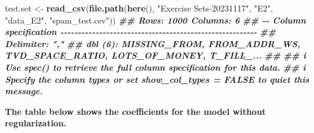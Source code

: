 \documentclass[
]{article}
\newenvironment{Shaded}{\begin{snugshade}}{\end{snugshade}}
\newcommand{\DocumentationTok}[1]{\textcolor[rgb]{0.56,0.35,0.01}{\textbf{\textit{#1}}}}
\newcommand{\FunctionTok}[1]{\textcolor[rgb]{0.13,0.29,0.53}{\textbf{#1}}}
\newcommand{\NormalTok}[1]{#1}
\newcommand{\OtherTok}[1]{\textcolor[rgb]{0.56,0.35,0.01}{#1}}
\newcommand{\SpecialCharTok}[1]{\textcolor[rgb]{0.81,0.36,0.00}{\textbf{#1}}}
\newcommand{\StringTok}[1]{\textcolor[rgb]{0.31,0.60,0.02}{#1}}
\begin{document}
\begin{Shaded}
\begin{Highlighting}[]
\NormalTok{test.set }\OtherTok{\textless{}{-}} 
  \FunctionTok{read\_csv}\NormalTok{(}\FunctionTok{file.path}\NormalTok{(}\FunctionTok{here}\NormalTok{(), }\StringTok{"Exercise Sets{-}20231117"}\NormalTok{, }\StringTok{"E2"}\NormalTok{, }\StringTok{"data\_E2"}\NormalTok{, }\StringTok{"spam\_test.csv"}\NormalTok{))}
\DocumentationTok{\#\# Rows: 1000 Columns: 6}
\DocumentationTok{\#\# {-}{-} Column specification {-}{-}{-}{-}{-}{-}{-}{-}{-}{-}{-}{-}{-}{-}{-}{-}{-}{-}{-}{-}{-}{-}{-}{-}{-}{-}{-}{-}{-}{-}{-}{-}{-}{-}{-}{-}{-}{-}{-}{-}{-}{-}{-}{-}{-}{-}{-}{-}{-}{-}{-}{-}{-}{-}{-}{-}}
\DocumentationTok{\#\# Delimiter: ","}
\DocumentationTok{\#\# dbl (6): MISSING\_FROM, FROM\_ADDR\_WS, TVD\_SPACE\_RATIO, LOTS\_OF\_MONEY, T\_FILL\_...}
\DocumentationTok{\#\# }
\DocumentationTok{\#\# i Use \textasciigrave{}spec()\textasciigrave{} to retrieve the full column specification for this data.}
\DocumentationTok{\#\# i Specify the column types or set \textasciigrave{}show\_col\_types = FALSE\textasciigrave{} to quiet this message.}
\end{Highlighting}
\end{Shaded}

\textbf{The table below shows the coefficients for the model without
regularization.}

\begin{Shaded}
\end{Shaded}
\end{document}
